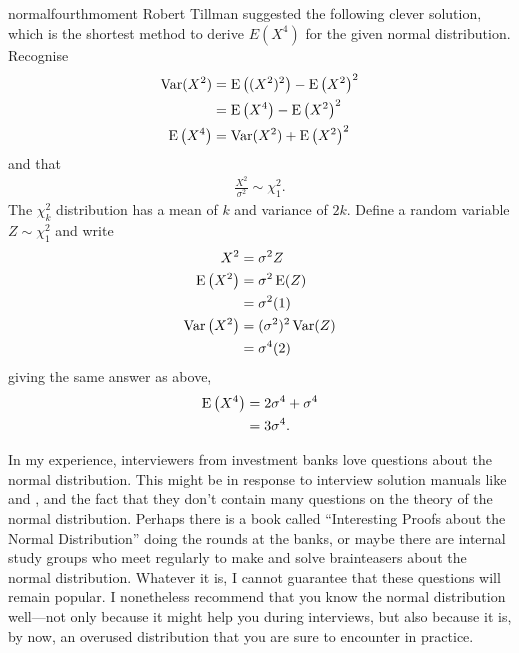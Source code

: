 \begin{answer}{normalfourthmoment}
Robert Tillman suggested the following clever solution, which is the shortest method to derive $E\left( X^4 \right)$ for the given normal distribution.
Recognise
\begin{align*}
\operatorname{\mathrm{Var}}(X^2) &= \operatorname{\mathrm{E}}\left((X^2)^2\right) - \operatorname{\mathrm{E}}\left( X^2 \right)^2  \\
          &= \operatorname{\mathrm{E}}\left(X^4\right) - \operatorname{\mathrm{E}}\left( X^2 \right)^2  \\
\operatorname{\mathrm{E}}\left(X^4\right)
&=  \operatorname{\mathrm{Var}}(X^2) + \operatorname{\mathrm{E}}\left( X^2 \right)^2
\end{align*}
and that
\begin{align*}
\frac{X^2}{\sigma^2} \sim \chi^2_{1}
\text{.}
\end{align*}
The $\chi^2_k$ distribution has a mean of $k$ and variance of $2k$.
Define a random variable
$Z \sim \chi^2_{1}$
and write
\begin{align*}
X^2 &= {\sigma^2} Z \\
\operatorname{\mathrm{E}}\left(X^2 \right) &= {\sigma^2} \operatorname{\mathrm{E}}( Z ) \\
                    &= {\sigma^2} (1) \\
\operatorname{\mathrm{Var}}\left(X^2 \right) &= (\sigma^2)^2 \operatorname{\mathrm{Var}}( Z ) \\
                    &= {\sigma^4} (2) \\
\end{align*}
giving the same answer as above,
\begin{align*}
\operatorname{\mathrm{E}}\left(X^4\right) &= 2 \sigma^4 + \sigma^4 \\
                   &= 3 \sigma^4
\text{.}
\end{align*}


In my experience, interviewers from investment banks love questions about the normal distribution.
This might be in response to interview solution manuals like
\citet{HeardOnTheStreet} and \citet{JoshiQA},
and the fact that they don't contain many questions on the theory of the normal distribution.
Perhaps there is a book called ``Interesting Proofs about the Normal Distribution'' doing the rounds at the banks, or maybe there are internal study groups who meet regularly to make and solve brainteasers about the normal distribution.
Whatever it is, I cannot guarantee that these questions will remain popular.
I nonetheless recommend that you know the normal distribution well---not only because it might help you during interviews, but also because it is, by now, an overused distribution that you are sure to encounter in practice.
\end{answer}
